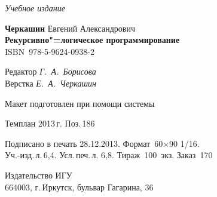 \documentclass[14pt, openany, twoside, draft]{extbook} %
\begin{document}
\vfill\vfill\vfill\vfill

\hfill{}{\small\itshape Учебное издание}
\vspace{4ex}
\begin{center}
{\small\textbf{Черкашин} Евгений Александрович\\[1em]}
{\bfseries Рекурсивно"=логическое программирование}\\[1em]
ISBN~978-5-9624-0938-2
\vfill

\small
Редактор \textit{Г.~А.~Борисова}\\
Верстка \textit{Е.~А.~Черкашин}

\vfill{}
{\small Макет подготовлен при помощи системы \LuaLaTeX\\\mbox{}}
\vfill{}

Темплан 2013\,{}г. Поз.\,{}186

\end{center}
\begin{center}\small
\noindent Подписано в печать 28.12.2013.
Формат~60$\times$90 1/16.\\  %
Уч.-изд.\,{}л.\,{}6,4. Усл.\,{}печ.\,{}л. 6,8. Тираж~100~экз. Заказ~170
\end{center}
\vspace{1           ex}
\begin{center}\small
Издательство ИГУ\\{}
664003, г.\,{}Иркутск, бульвар Гагарина, 36
\end{center}
\end{document}
